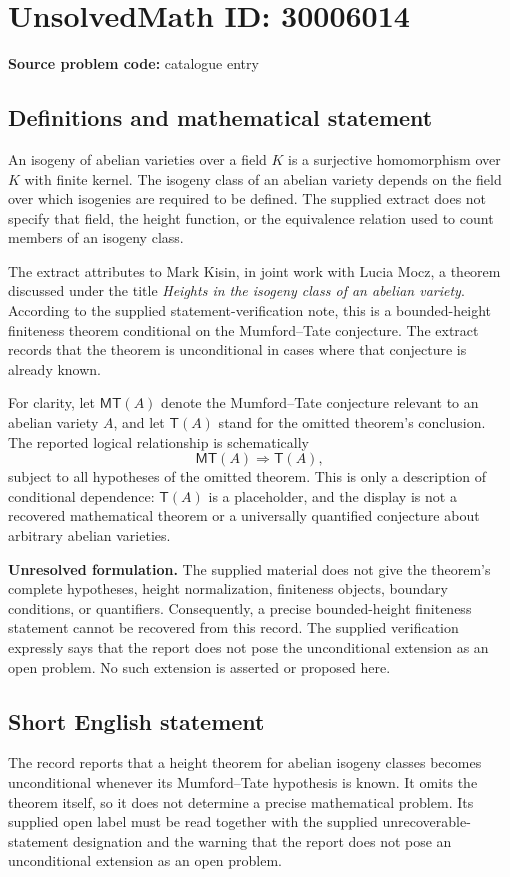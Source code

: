 \documentclass[11pt]{article}
\begin{document}
\section*{UnsolvedMath ID: 30006014}
\textbf{Source problem code:} catalogue entry
\subsection{Definitions and mathematical statement}
An isogeny of abelian varieties over a field \(K\) is a surjective homomorphism over \(K\) with finite kernel. The isogeny class of an abelian variety depends on the field over which isogenies are required to be defined. The supplied extract does not specify that field, the height function, or the equivalence relation used to count members of an isogeny class.

The extract attributes to Mark Kisin, in joint work with Lucia Mocz, a theorem discussed under the title \emph{Heights in the isogeny class of an abelian variety}. According to the supplied statement-verification note, this is a bounded-height finiteness theorem conditional on the Mumford--Tate conjecture. The extract records that the theorem is unconditional in cases where that conjecture is already known.

For clarity, let \(\mathsf{MT}(A)\) denote the Mumford--Tate conjecture relevant to an abelian variety \(A\), and let \(\mathsf{T}(A)\) stand for the omitted theorem's conclusion. The reported logical relationship is schematically
\[
\mathsf{MT}(A)\Longrightarrow\mathsf{T}(A),
\]
subject to all hypotheses of the omitted theorem. This is only a description of conditional dependence: \(\mathsf{T}(A)\) is a placeholder, and the display is not a recovered mathematical theorem or a universally quantified conjecture about arbitrary abelian varieties.

\textbf{Unresolved formulation.} The supplied material does not give the theorem's complete hypotheses, height normalization, finiteness objects, boundary conditions, or quantifiers. Consequently, a precise bounded-height finiteness statement cannot be recovered from this record. The supplied verification expressly says that the report does not pose the unconditional extension as an open problem. No such extension is asserted or proposed here.
\subsection{Short English statement}
The record reports that a height theorem for abelian isogeny classes becomes unconditional whenever its Mumford--Tate hypothesis is known. It omits the theorem itself, so it does not determine a precise mathematical problem. Its supplied open label must be read together with the supplied unrecoverable-statement designation and the warning that the report does not pose an unconditional extension as an open problem.
\end{document}

